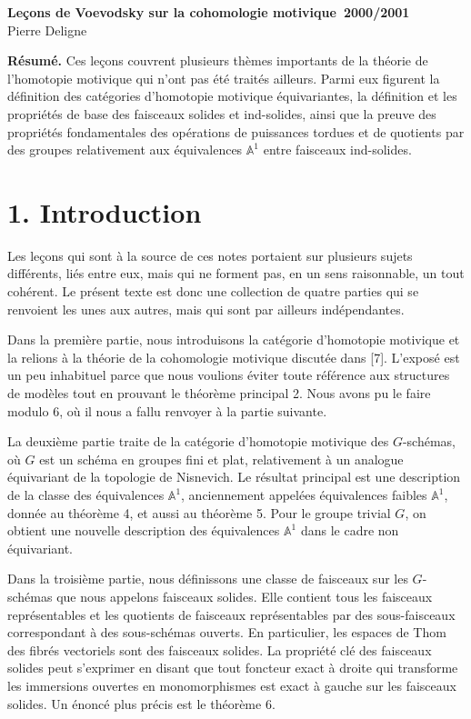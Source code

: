 \documentclass[11pt]{article}
\newcommand{\Aone}{\mathbb A^1}
\theoremstyle{deligne}
\begin{document}
\begin{center}
{\Large\bfseries Leçons de Voevodsky sur la cohomologie motivique\ 2000/2001}\\[0.6em]
{\large Pierre Deligne}
\end{center}

\textbf{Résumé.} Ces leçons couvrent plusieurs thèmes importants de la théorie de l'homotopie motivique qui n'ont pas été traités ailleurs. Parmi eux figurent la définition des catégories d'homotopie motivique équivariantes, la définition et les propriétés de base des faisceaux solides et ind-solides, ainsi que la preuve des propriétés fondamentales des opérations de puissances tordues et de quotients par des groupes relativement aux équivalences \(\Aone\) entre faisceaux ind-solides.

\section*{1. Introduction}

Les leçons qui sont à la source de ces notes portaient sur plusieurs sujets différents, liés entre eux, mais qui ne forment pas, en un sens raisonnable, un tout cohérent. Le présent texte est donc une collection de quatre parties qui se renvoient les unes aux autres, mais qui sont par ailleurs indépendantes.

Dans la première partie, nous introduisons la catégorie d'homotopie motivique et la relions à la théorie de la cohomologie motivique discutée dans [7]. L'exposé est un peu inhabituel parce que nous voulions éviter toute référence aux structures de modèles tout en prouvant le théorème principal 2. Nous avons pu le faire modulo 6, où il nous a fallu renvoyer à la partie suivante.

La deuxième partie traite de la catégorie d'homotopie motivique des \(G\)-schémas, où \(G\) est un schéma en groupes fini et plat, relativement à un analogue équivariant de la topologie de Nisnevich. Le résultat principal est une description de la classe des équivalences \(\Aone\), anciennement appelées équivalences faibles \(\Aone\), donnée au théorème 4, et aussi au théorème 5. Pour le groupe trivial \(G\), on obtient une nouvelle description des équivalences \(\Aone\) dans le cadre non équivariant.

Dans la troisième partie, nous définissons une classe de faisceaux sur les \(G\)-schémas que nous appelons faisceaux solides. Elle contient tous les faisceaux représentables et les quotients de faisceaux représentables par des sous-faisceaux correspondant à des sous-schémas ouverts. En particulier, les espaces de Thom des fibrés vectoriels sont des faisceaux solides. La propriété clé des faisceaux solides peut s'exprimer en disant que tout foncteur exact à droite qui transforme les immersions ouvertes en monomorphismes est exact à gauche sur les faisceaux solides. Un énoncé plus précis est le théorème 6.
\end{document}
